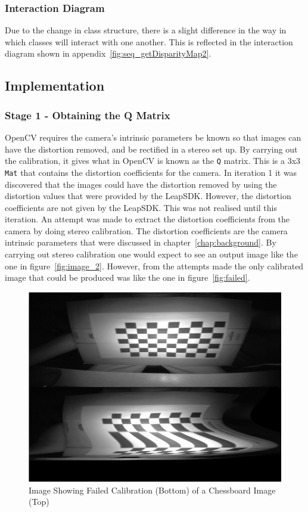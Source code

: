 \documentclass[11pt,oneside]{report}
\newcommand\code[1]{\texttt{#1}}
\begin{document}
			\subsubsection{Interaction Diagram}
				Due to the change in class structure, there is a slight difference in the way in which classes will interact with one another. 
				This is reflected in the interaction diagram shown in appendix~\ref{fig:seq_getDisparityMap2}.
				
		\subsection{Implementation}
		\subsubsection{Stage 1 - Obtaining the Q Matrix}
			OpenCV requires the camera's intrinsic parameters be known so that images can have the distortion removed, and be rectified in a stereo set up.
			By carrying out the calibration, it gives what in OpenCV is known as the \code{Q} matrix.
			This is a 3x3 \code{Mat} that contains the distortion coefficients for the camera.
			In iteration 1 it was discovered that the images could have the distortion removed by using the distortion values that were provided by the LeapSDK.
			However, the distortion coefficients are not given by the LeapSDK.
			This was not realised until this iteration.
			An attempt was made to extract the distortion coefficients from the camera by doing stereo calibration.
			The distortion coefficients are the camera intrinsic parameters that were discussed in chapter~\ref{chap:background}.
			By carrying out stereo calibration one would expect to see an output image like the one in figure~\ref{fig:image_2}.
			However, from the attempts made the only calibrated image that could be produced was like the one in figure~\ref{fig:failed}.
			\begin{figure}
		\centering
    			\includegraphics[width=\textwidth]{failed_attempt}
    			\caption{Image Showing Failed Calibration (Bottom) of a Chessboard Image (Top) \protect {\label{fig:failed}}}
			
		\end{figure}	
\end{document}
